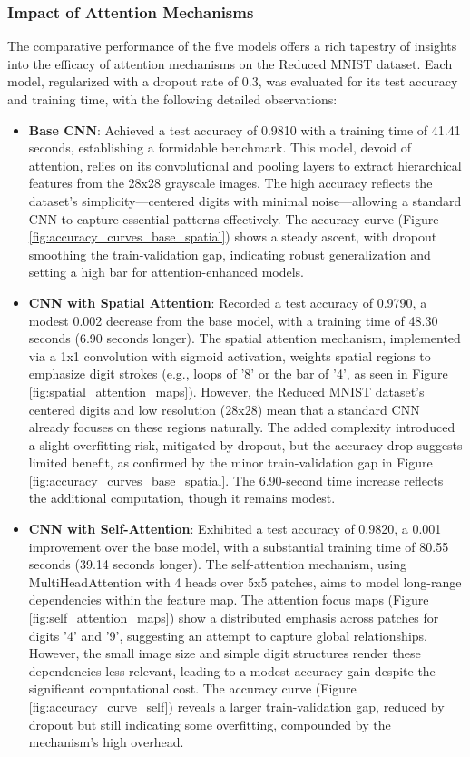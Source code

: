 \documentclass[12pt]{article}
\begin{document}
\subsubsection{Impact of Attention Mechanisms}
The comparative performance of the five models offers a rich tapestry of insights into the efficacy of attention mechanisms on the Reduced MNIST dataset. Each model, regularized with a dropout rate of 0.3, was evaluated for its test accuracy and training time, with the following detailed observations:

\begin{itemize}
    \item \textbf{Base CNN}: Achieved a test accuracy of 0.9810 with a training time of 41.41 seconds, establishing a formidable benchmark. This model, devoid of attention, relies on its convolutional and pooling layers to extract hierarchical features from the 28x28 grayscale images. The high accuracy reflects the dataset's simplicity—centered digits with minimal noise—allowing a standard CNN to capture essential patterns effectively. The accuracy curve (Figure \ref{fig:accuracy_curves_base_spatial}) shows a steady ascent, with dropout smoothing the train-validation gap, indicating robust generalization and setting a high bar for attention-enhanced models.
    
    \item \textbf{CNN with Spatial Attention}: Recorded a test accuracy of 0.9790, a modest 0.002 decrease from the base model, with a training time of 48.30 seconds (6.90 seconds longer). The spatial attention mechanism, implemented via a 1x1 convolution with sigmoid activation, weights spatial regions to emphasize digit strokes (e.g., loops of '8' or the bar of '4', as seen in Figure \ref{fig:spatial_attention_maps}). However, the Reduced MNIST dataset's centered digits and low resolution (28x28) mean that a standard CNN already focuses on these regions naturally. The added complexity introduced a slight overfitting risk, mitigated by dropout, but the accuracy drop suggests limited benefit, as confirmed by the minor train-validation gap in Figure \ref{fig:accuracy_curves_base_spatial}. The 6.90-second time increase reflects the additional computation, though it remains modest.
    
    \item \textbf{CNN with Self-Attention}: Exhibited a test accuracy of 0.9820, a 0.001 improvement over the base model, with a substantial training time of 80.55 seconds (39.14 seconds longer). The self-attention mechanism, using MultiHeadAttention with 4 heads over 5x5 patches, aims to model long-range dependencies within the feature map. The attention focus maps (Figure \ref{fig:self_attention_maps}) show a distributed emphasis across patches for digits '4' and '9', suggesting an attempt to capture global relationships. However, the small image size and simple digit structures render these dependencies less relevant, leading to a modest accuracy gain despite the significant computational cost. The accuracy curve (Figure \ref{fig:accuracy_curve_self}) reveals a larger train-validation gap, reduced by dropout but still indicating some overfitting, compounded by the mechanism's high overhead.
    

\end{itemize}
\end{document}
